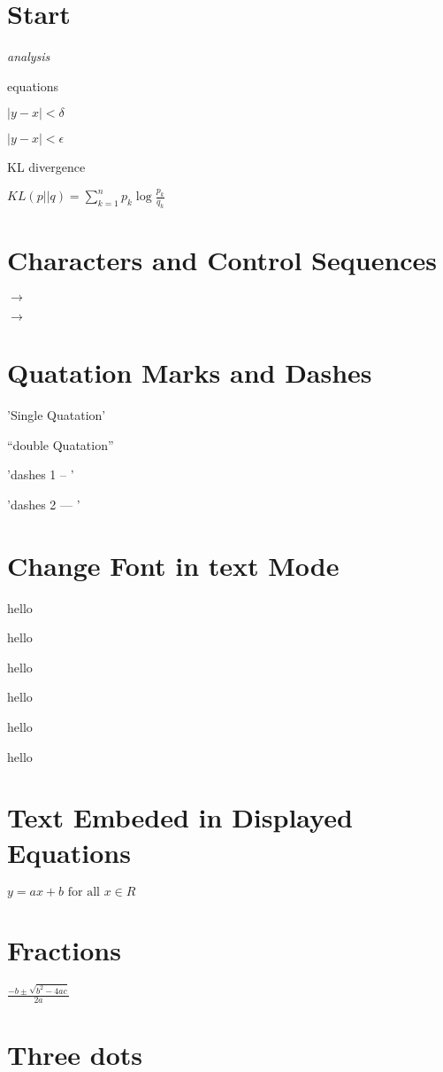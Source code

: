 \documentclass[a4paper,12pt]{article}
\begin{document}
\section{Start}

\noindent
\emph{analysis}

equations 

$|y-x| < \delta $

$|y-x| < \epsilon$

KL divergence

$KL(p||q) = \sum_{k=1}^{n} p_k \log \frac{p_k}{q_k} $


\section{Characters and Control Sequences}


$\to$

$\rightarrow$


\section{Quatation Marks and Dashes}


'Single Quatation'

``double Quatation''

'dashes 1 -- '

'dashes 2 --- '


\section{Change Font in text Mode}
\tiny hello

\small hello


\Large hello

\huge hello


\small hello

\large hello

\section{Text Embeded in Displayed Equations}


$y = ax + b \mbox{ for all } x \in R $

\section{Fractions}

$\frac{-b \pm \sqrt{b^2 - 4ac}}{2a}$

\section{Three dots}
\end{document}
